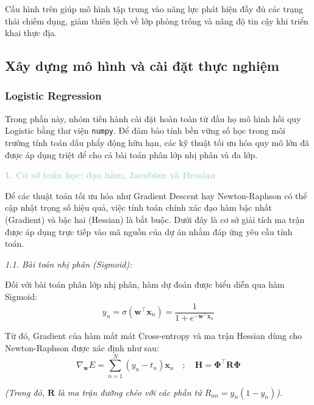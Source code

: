 Cấu hình trên giúp mô hình tập trung vào năng lực phát hiện đầy đủ các trạng thái chiếm dụng, giảm thiên lệch về lớp phòng trống và nâng độ tin cậy khi triển khai thực địa.

\subsection{Xây dựng mô hình và cài đặt thực nghiệm}

\subsubsection{Logistic Regression}

Trong phần này, nhóm tiến hành cài đặt hoàn toàn từ đầu họ mô hình hồi quy Logistic bằng thư viện \texttt{numpy}. Để đảm bảo tính bền vững số học trong môi trường tính toán dấu phẩy động hữu hạn, các kỹ thuật tối ưu hóa quy mô lớn đã được áp dụng triệt để cho cả bài toán phân lớp nhị phân và đa lớp.

\vspace{0.5em}
\noindent\textcolor{lightblue}{\textbf{1. Cơ sở toán học: đạo hàm, Jacobian và Hessian}}
\vspace{0.5em}

Để các thuật toán tối ưu hóa như Gradient Descent hay Newton-Raphson có thể cập nhật trọng số hiệu quả, việc tính toán chính xác đạo hàm bậc nhất (Gradient) và bậc hai (Hessian) là bắt buộc. Dưới đây là cơ sở giải tích ma trận được áp dụng trực tiếp vào mã nguồn của dự án nhằm đáp ứng yêu cầu tính toán.

\noindent\textcolor{infocolor}{\textit{1.1. Bài toán nhị phân (Sigmoid):}}

Đối với bài toán phân lớp nhị phân, hàm dự đoán được biểu diễn qua hàm Sigmoid:
\begin{equation}
    y_n = \sigma(\mathbf{w}^\top \mathbf{x}_n) = \frac{1}{1 + e^{-\mathbf{w}^\top \mathbf{x}_n}}
\end{equation}

Từ đó, Gradient của hàm mất mát Cross-entropy và ma trận Hessian dùng cho Newton-Raphson được xác định như sau:
\begin{equation}
    \nabla_{\mathbf{w}} E = \sum_{n=1}^N (y_n - t_n)\mathbf{x}_n \quad ; \quad \mathbf{H} = \mathbf{\Phi}^\top \mathbf{R} \mathbf{\Phi}
\end{equation}

\textit{(Trong đó, $\mathbf{R}$ là ma trận đường chéo với các phần tử $R_{nn} = y_n(1-y_n)$).}

